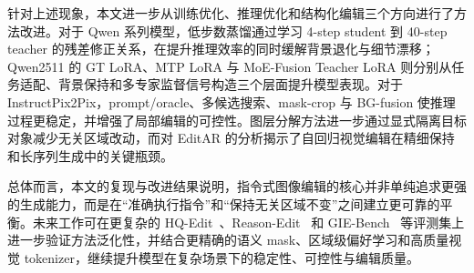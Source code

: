 \documentclass[UTF8,11pt,a4paper,fontset=fandol]{ctexart}
\begin{document}
针对上述现象，本文进一步从训练优化、推理优化和结构化编辑三个方向进行了方法改进。对于 Qwen 系列模型，低步数蒸馏通过学习 4-step student 到 40-step teacher 的残差修正关系，在提升推理效率的同时缓解背景退化与细节漂移；Qwen2511 的 GT LoRA、MTP LoRA 与 MoE-Fusion Teacher LoRA 则分别从任务适配、背景保持和多专家监督信号构造三个层面提升模型表现。对于 InstructPix2Pix，prompt/oracle、多候选搜索、mask-crop 与 BG-fusion 使推理过程更稳定，并增强了局部编辑的可控性。图层分解方法进一步通过显式隔离目标对象减少无关区域改动，而对 EditAR 的分析揭示了自回归视觉编辑在精细保持和长序列生成中的关键瓶颈。

总体而言，本文的复现与改进结果说明，指令式图像编辑的核心并非单纯追求更强的生成能力，而是在“准确执行指令”和“保持无关区域不变”之间建立更可靠的平衡。未来工作可在更复杂的 HQ-Edit~\cite{hqedit}、Reason-Edit~\cite{smartedit} 和 GIE-Bench~\cite{giebench} 等评测集上进一步验证方法泛化性，并结合更精确的语义 mask、区域级偏好学习和高质量视觉 tokenizer，继续提升模型在复杂场景下的稳定性、可控性与编辑质量。
\end{document}
